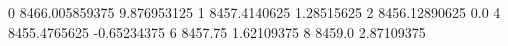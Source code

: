 0 8466.005859375 9.876953125
1 8457.4140625 1.28515625
2 8456.12890625 0.0
4 8455.4765625 -0.65234375
6 8457.75 1.62109375
8 8459.0 2.87109375
